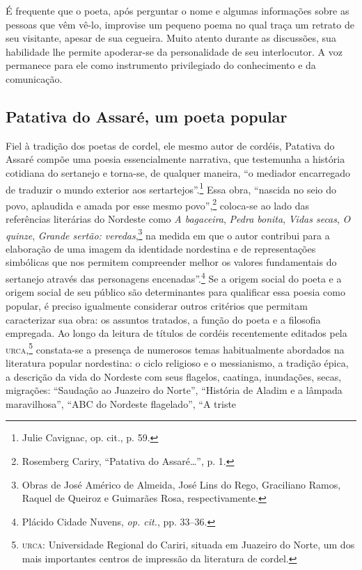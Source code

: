 \noindent É frequente que o poeta, após perguntar o nome e algumas
informações sobre as pessoas que vêm vê-lo, improvise um pequeno poema no qual
traça um retrato de seu visitante, apesar de sua cegueira. Muito atento durante
as discussões, sua habilidade lhe permite apoderar-se da personalidade de seu
interlocutor. A voz permanece para ele como instrumento privilegiado do
conhecimento e da comunicação.

\subsection{Patativa do Assaré, um poeta popular}

Fiel à tradição dos poetas de cordel, ele mesmo autor de cordéis, Patativa do
Assaré compõe uma poesia essencialmente narrativa, que testemunha a história
cotidiana do sertanejo e torna-se, de qualquer maneira, “o mediador encarregado
de traduzir o mundo exterior aos sertartejos”.\footnote{ Julie Cavignac, op.
cit., p. 59.} Essa obra, “nascida no seio do povo, aplaudida e amada por esse
mesmo povo”,\footnote{ Rosemberg Cariry, “Patativa do Assaré\ldots{}”, p. 1.}
coloca-se ao lado das referências literárias do Nordeste como \textit{A bagaceira}, \textit{Pedra
bonita}, \textit{Vidas secas}, \textit{O quinze}, \textit{Grande
sertão: veredas},\footnote{ Obras de José Américo de
Almeida, José Lins do Rego, Graciliano Ramos, Raquel de Queiroz e Guimarães
Rosa, respectivamente.} na medida em que o autor contribui para a elaboração de uma imagem da
identidade nordestina e de representações simbólicas que nos permitem
compreender melhor os valores fundamentais do sertanejo através das personagens
encenadas”.\footnote{ Plácido Cidade Nuvens, \textit{op. cit.}, pp. 33--36.} Se a
origem social do poeta e a origem social de seu público são determinantes para
qualificar essa poesia como popular, é preciso igualmente considerar outros
critérios que permitam caracterizar sua obra: os assuntos tratados, a função do
poeta e a filosofia empregada. Ao longo da leitura de títulos de cordéis
recentemente editados pela \textsc{urca},\footnote{ \textsc{urca}: Universidade Regional do Cariri,
situada em Juazeiro do Norte, um dos mais importantes centros de impressão da
literatura de cordel.} constata-se a presença de numerosos temas habitualmente
abordados na literatura popular nordestina: o ciclo religioso e o messianismo, a
tradição épica, a descrição da vida do Nordeste com seus flagelos, caatinga,
inundações, secas, migrações: “Saudação ao Juazeiro do Norte”, “História de
Aladim e a lâmpada maravilhosa”, “ABC do Nordeste flagelado”, “A triste
